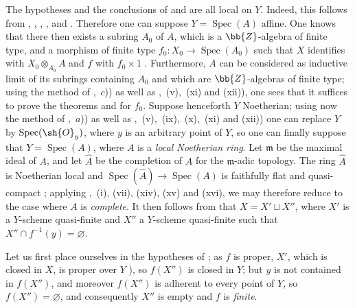 
\begin{env}[8.11.4]
\label{IV.8.11.4}
The hypotheses and the conclusions of  and  are all local on $Y$.
Indeed, this follows from , , , , and .
Therefore one can suppose $Y=\operatorname{Spec}(A)$ affine.
One knows that there then exists a subring $A_0$ of $A$, which is a $\bb{Z}$-algebra of finite type, and a morphism of finite type $f_0:X_0\to\operatorname{Spec}(A_0)$ such that $X$ identifies with $X_0\otimes_{A_0}A$ and $f$ with $f_0\times 1$ .
Furthermore, $A$ can be considered as inductive limit of its subrings containing $A_0$ and which are $\bb{Z}$-algebras of finite type; using the method of ,~$c$)) as well as ,~(v),~(xi) and (xii)), one sees that it suffices to prove the theorems  and  for $f_0$.
Suppose henceforth $Y$ Noetherian; using now the method of ,~$a$)) as well as ,~(v),~(ix),~(x),~(xi) and (xii)) one can replace $Y$ by $\operatorname{Spec}(\sh{O}_y)$, where $y$ is an
arbitrary point of $Y$, so one can finally suppose that $Y=\operatorname{Spec}(A)$, where $A$ is a \emph{local Noetherian ring}.
Let $\mathfrak{m}$ be the maximal ideal of $A$, and let $\hat{A}$ be the completion of $A$ for the $\mathfrak{m}$-adic topology. The ring $\hat{A}$ is Noetherian local and $\operatorname{Spec}(\hat{A})\to\operatorname{Spec}(A)$ is faithfully flat and quasi-compact ; applying ,~(i), (vii), (xiv), (xv) and (xvi), we may therefore reduce to the case where $A$ is \emph{complete}.
It then follows from  that $X=X'\sqcup X''$, where $X'$ is a $Y$-scheme quasi-finite and $X''$ a $Y$-scheme quasi-finite such that $X''\cap f^{-1}(y)=\varnothing$.
\end{env}

Let us first place ourselves in the hypotheses of ; as $f$ is proper, $X'$, which is closed in $X$, is proper over $Y$ ), so $f(X'')$ is closed in $Y$; but $y$ is not contained in $f(X'')$, and moreover $f(X'')$ is adherent to every point of $Y$, so $f(X'')=\varnothing$, and consequently $X''$ is empty and $f$ is \emph{finite}.

